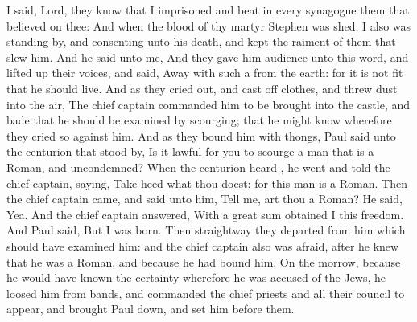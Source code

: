 {I
said,
Lord,
they
know
that
I
imprisoned
and
beat in
every
synagogue them
that
believed
on
thee:
And
when the
blood of
thy
martyr
Stephen was
shed,
I
also
was standing
by,
and consenting
unto
his
death,
and
kept the
raiment of
them that
slew
him.
And he
said
unto
me,
{}
And they
gave
him
audience
unto
this
word,
and
{} lifted
up
their
voices, and
said, Away
with such
a
{}
from the
earth:
for it
is
not
fit that
he should
live.
And as
they cried
out,
and cast
off
{}
clothes,
and
threw
dust
into the
air,
The chief
captain
commanded
him to be
brought
into the
castle, and bade
that
he should be
examined by
scourging;
that he might
know
wherefore they
cried
so against
him.
And
as they
bound
him with
thongs,
Paul
said
unto the
centurion
that stood
by, Is it
lawful for
you to
scourge a
man that is a
Roman,
and
uncondemned?
When the
centurion
heard
{}, he
went and
told the chief
captain,
saying, Take
heed
what thou
doest:
for
this
man
is a
Roman.
Then the chief
captain
came, and
said unto
him,
Tell
me,
art
thou a
Roman? He
said,
Yea.
And the chief
captain
answered, With a
great
sum
obtained
I
this
freedom.
And
Paul
said,
But
I
was
{}
born.
Then
straightway they
departed
from
him
which
should have
examined
him:
and the chief
captain
also was
afraid, after he
knew
that he
was a
Roman,
and
because he
had
bound
him.
On the
morrow,
because he
would have
known the
certainty
wherefore he was
accused
of the
Jews, he
loosed
him
from
{}
bands,
and
commanded the chief
priests
and
all
their
council to
appear,
and
brought
Paul
down, and set
him
before
them.

}
